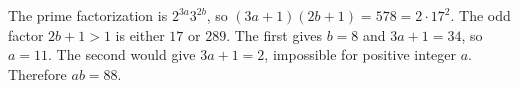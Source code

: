 The prime factorization is $2^{3a}3^{2b}$, so $(3a+1)(2b+1)=578=2\cdot17^2$. The odd factor $2b+1>1$ is either $17$ or $289$. The first gives $b=8$ and $3a+1=34$, so $a=11$. The second would give $3a+1=2$, impossible for positive integer $a$. Therefore $\boxed{ab=88}$.
